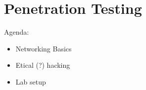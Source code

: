 \section{Penetration Testing}
\begin{flushleft}
Agenda:
\begin{itemize}
	\item Networking Basics
	\item Etical (?) hacking
	\item Lab setup
\end{itemize}
\end{flushleft}
